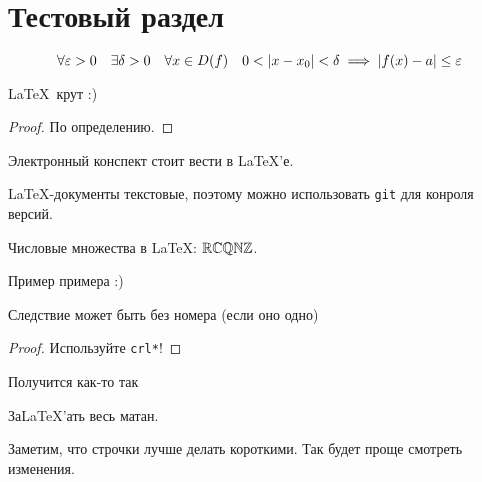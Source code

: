 \documentclass[../../main.tex]{subfiles}
\begin{document}
\section{Тестовый раздел}

\begin{defn}[Коши]
    \[\forall \varepsilon > 0 \quad \exists \delta > 0 \quad \forall x \in D(f) \quad
      0 < \left|{x-x_0}\right| < \delta \implies \left|{f(x) - a}\right| \le \varepsilon\]
\end{defn}

\begin{thm}
    \LaTeX\ крут :)
\end{thm}

\begin{proof}
    По определению.
\end{proof}

\begin{crl}
    Электронный конспект стоит вести в \LaTeX'е.
\end{crl}

\begin{crl}
    \LaTeX-документы текстовые,
    поэтому можно использовать \texttt{git} для конроля версий.
\end{crl}

\begin{rem}
    Числовые множества в \LaTeX: $\mathbb{R}\mathbb{C}\mathbb{Q}\mathbb{N}\mathbb{Z}$.
\end{rem}

\begin{exmp}
    Пример примера :)
\end{exmp}


\begin{lem}
 Следствие может быть без номера (если оно одно)
\end{lem}

\begin{proof}
 Используйте \texttt{crl*}!
\end{proof}

\begin{crl*}
    Получится как-то так
\end{crl*}

\begin{exc}
    За\LaTeX'ать весь матан.
\end{exc}

\bigskip

Заметим, что строчки лучше делать короткими.
Так будет проще смотреть изменения.
\end{document}
